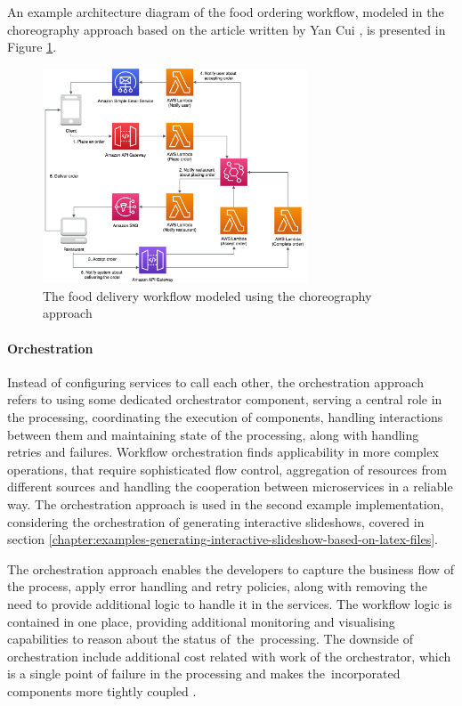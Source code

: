 An example architecture diagram of the food ordering workflow, modeled in the choreography approach based on the article written by Yan Cui \cite{ChoreographyVsOrchestrationInTheLandOfServerless}, is presented in Figure \ref{fig:choreography-diagram}.

\begin{figure}[H]
   \centering
   \includegraphics[width=0.7\textwidth]{assets/04-serverless-for-web-apps/choreography.png}
   \caption{The food delivery workflow modeled using the choreography approach}
   \label{fig:choreography-diagram}
\end{figure}

\paragraph{Orchestration}

Instead of configuring services to call each other, the orchestration approach refers to using some dedicated orchestrator component, serving a central role in the processing, coordinating the execution of components, handling interactions between them and maintaining state of the processing, along with handling retries and failures.
Workflow orchestration finds applicability in more complex operations, that require sophisticated flow control, aggregation of resources from different sources and handling the cooperation between microservices in a reliable way.
The orchestration approach is used in the second example implementation, considering the orchestration of generating interactive slideshows, covered in section \ref{chapter:examples-generating-interactive-slideshow-based-on-latex-files}.

The orchestration approach enables the developers to capture the business flow of the process, apply error handling and retry policies, along with removing the need to provide additional logic to handle it in the services.
The workflow logic is contained in one place, providing additional monitoring and visualising capabilities to reason about the status of~the~processing.
The downside of orchestration include additional cost related with work of the orchestrator, which is a single point of failure in the processing and makes the~incorporated components more tightly coupled \cite{ChoreographyVsOrchestrationInServerlessMicroservices}.

